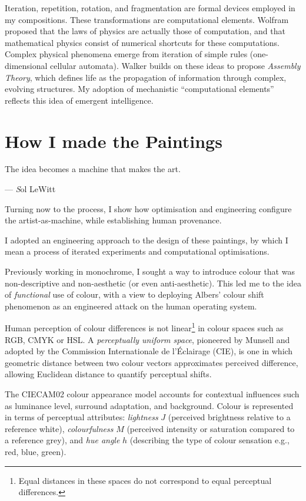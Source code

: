 \documentclass[12pt]{article}
\newcommand{\epigraphsource}[1]{--- {\small\textit #1}}
\begin{document}
Iteration, repetition, rotation, and fragmentation are formal devices
employed in my compositions. These transformations are computational
elements. Wolfram proposed that the laws of physics
are actually those of computation, and that mathematical physics
consist of numerical shortcuts for these computations.\autocite{wolfram1984} Complex
physical phenomena emerge from iteration of simple rules
(one-dimensional cellular automata).\autocite{wolfram}
Walker builds on these ideas to propose
\emph{Assembly Theory}, which defines life as the propagation of
information through complex, evolving structures.\autocite{walker2024life} My adoption of
mechanistic ``computational elements'' reflects this idea of
emergent intelligence.

\section{How I made the Paintings}\label{sec:process}
\epigraph{The idea becomes a machine that makes the art.}{\epigraphsource{Sol LeWitt}}

Turning now to the process, I show how optimisation and engineering
configure the artist-as-machine, while establishing human provenance.

I adopted an engineering approach to the design of these paintings, by
which I mean a process of iterated experiments and computational
optimisations.

Previously working in monochrome, I sought a way to introduce
colour that was non-descriptive and non-aesthetic (or even
anti-aesthetic). This led me to the idea of \emph{functional} use of
colour, with a view to deploying Albers' colour shift phenomenon
as an engineered attack on the human operating system.

Human perception of colour differences\autocite{MacAdam1942} is not
linear\footnote{Equal distances in these spaces do not correspond to
  equal perceptual differences.} in colour spaces such as RGB, CMYK or
HSL.\autocite{Luo2001CIECAM02} A \emph{perceptually uniform space},
pioneered by Munsell\autocite{Munsell1915} and adopted by the Commission
Internationale de l'\'{E}clairage
(CIE),\autocite{CIE1976,CIE1978Uniform,Luo2001CIEDE2000} is one in which
geometric distance between two colour vectors approximates perceived
difference, allowing Euclidean distance to quantify perceptual shifts.

The CIECAM02 colour appearance
model\autocite{Luo2001CIECAM02,CIE1592004} accounts for
contextual influences such as luminance level, surround adaptation,
and background. Colour is represented in terms of perceptual
attributes: \emph{lightness} $J$ (perceived brightness relative to a
reference white), \emph{colourfulness} $M$ (perceived intensity or
saturation compared to a reference grey), and \emph{hue angle} $h$
(describing the type of colour sensation e.g., red, blue, green).
\end{document}
